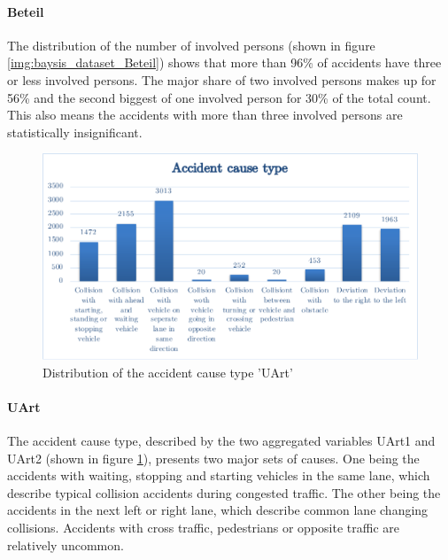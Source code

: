 \documentclass[a4paper,12pt]{report}
\begin{document}
\paragraph{Beteil}
The distribution of the number of involved persons (shown in figure \ref{img:baysis_dataset_Beteil}) shows that more than 96\% of accidents have three or less involved persons. The major share of two involved persons makes up for 56\% and the second biggest of one involved person for 30\% of the total count. This also means the accidents with more than three involved persons are statistically insignificant.

\begin{figure}[h]
	\centering
	\includegraphics[scale=0.6]{./assets/baysis_dataset_UArt.pdf}
	\caption{Distribution of the accident cause type 'UArt'}
	\label{img:baysis_dataset_UArt}
\end{figure}

\paragraph{UArt}
The accident cause type, described by the two aggregated variables UArt1 and UArt2 (shown in figure \ref{img:baysis_dataset_UArt}), presents two major sets of causes. One being the accidents with waiting, stopping and starting vehicles in the same lane, which describe typical collision accidents during congested traffic. The other being the accidents in the next left or right lane, which describe common lane changing collisions. Accidents with cross traffic, pedestrians or opposite traffic are relatively uncommon.
\end{document}
